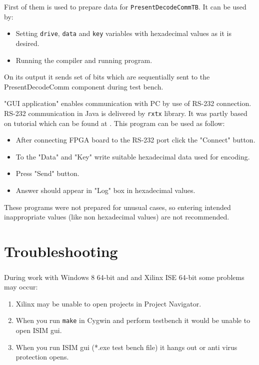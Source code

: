 \documentclass{gajewski}
\begin{document}
First of them is used to prepare data for \texttt{PresentDecodeCommTB}. It can be used by:
\begin{itemize}
    \item Setting \texttt{drive}, \texttt{data} and \texttt{key} variables with hexadecimal values as it is desired.
    \item Running the compiler and running program.
\end{itemize}

On its output it sends set of bits which are sequentially sent to the PresentDecodeComm component during test bench.

"GUI application" enables communication with PC by use of RS-232 connection. RS-232 communication in Java is delivered by  \texttt{rxtx} library. It was partly based on tutorial which can be found at \cite{GUIComm}. 
This program can be used as follow:
\begin{itemize}
    \item After connecting FPGA board to the RS-232 port click the "Connect" button.
    \item To the "Data" and "Key" write suitable hexadecimal data used for encoding.
    \item Press "Send" button.
    \item Answer should appear in "Log" box in hexadecimal values.
\end{itemize}
These programs were not prepared for unusual cases, so entering intended inappropriate values (like non hexadecimal values) are not recommended.

\newpage

\section{Troubleshooting}

During work with Windows 8 64-bit and and Xilinx\textsuperscript{\textregistered} ISE 64-bit some problems may occur:

\begin{enumerate}
    \item Xilinx may be unable to open projects in Project Navigator.
    \item When you run \texttt{make} in Cygwin and perform testbench it would be unable to open ISIM gui.
    \item When you run ISIM gui  (*.exe test bench file) it hangs out or anti virus protection opens.
\end{enumerate}
\end{document}
